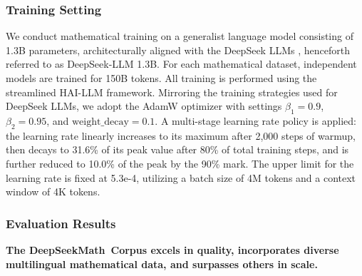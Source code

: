 \subsubsection{Training Setting}
\label{sec:quality-policy}
We conduct mathematical training on a generalist language model consisting of 1.3B parameters, architecturally aligned with the DeepSeek LLMs \citep{deepseek-llm}, henceforth referred to as DeepSeek-LLM 1.3B. For each mathematical dataset, independent models are trained for 150B tokens. All training is performed using the streamlined HAI-LLM \citep{haillm} framework. Mirroring the training strategies used for DeepSeek LLMs, we adopt the AdamW optimizer \citep{adamW} with settings $\beta_1=0.9$, $\beta_2=0.95$, and $\mathrm{weight\_decay}=0.1$. A multi-stage learning rate policy is applied: the learning rate linearly increases to its maximum after 2,000 steps of warmup, then decays to 31.6\% of its peak value after 80\% of total training steps, and is further reduced to 10.0\% of the peak by the 90\% mark. The upper limit for the learning rate is fixed at 5.3e-4, utilizing a batch size of 4M tokens and a context window of 4K tokens.

\subsubsection{Evaluation Results}

\textbf{The DeepSeekMath~Corpus excels in quality, incorporates diverse multilingual mathematical data, and surpasses others in scale.}

